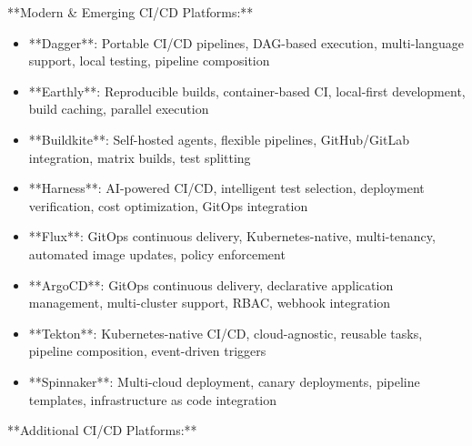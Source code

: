 \documentclass[11pt,a4paper]{article}
\begin{document}
**Modern \& Emerging CI/CD Platforms:**

\begin{itemize}
\item **Dagger**: Portable CI/CD pipelines, DAG-based execution, multi-language support, local testing, pipeline composition
\end{itemize}

\begin{itemize}
\item **Earthly**: Reproducible builds, container-based CI, local-first development, build caching, parallel execution
\end{itemize}

\begin{itemize}
\item **Buildkite**: Self-hosted agents, flexible pipelines, GitHub/GitLab integration, matrix builds, test splitting
\end{itemize}

\begin{itemize}
\item **Harness**: AI-powered CI/CD, intelligent test selection, deployment verification, cost optimization, GitOps integration
\end{itemize}

\begin{itemize}
\item **Flux**: GitOps continuous delivery, Kubernetes-native, multi-tenancy, automated image updates, policy enforcement
\end{itemize}

\begin{itemize}
\item **ArgoCD**: GitOps continuous delivery, declarative application management, multi-cluster support, RBAC, webhook integration
\end{itemize}

\begin{itemize}
\item **Tekton**: Kubernetes-native CI/CD, cloud-agnostic, reusable tasks, pipeline composition, event-driven triggers
\end{itemize}

\begin{itemize}
\item **Spinnaker**: Multi-cloud deployment, canary deployments, pipeline templates, infrastructure as code integration
\end{itemize}

**Additional CI/CD Platforms:**
\end{document}
